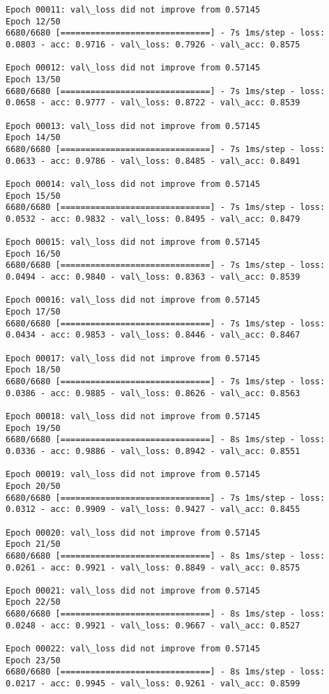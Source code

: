 \documentclass[11pt]{article}
\begin{document}
\begin{Verbatim}[commandchars=\\\{\}]
Epoch 00011: val\_loss did not improve from 0.57145
Epoch 12/50
6680/6680 [==============================] - 7s 1ms/step - loss: 0.0803 - acc: 0.9716 - val\_loss: 0.7926 - val\_acc: 0.8575

Epoch 00012: val\_loss did not improve from 0.57145
Epoch 13/50
6680/6680 [==============================] - 7s 1ms/step - loss: 0.0658 - acc: 0.9777 - val\_loss: 0.8722 - val\_acc: 0.8539

Epoch 00013: val\_loss did not improve from 0.57145
Epoch 14/50
6680/6680 [==============================] - 7s 1ms/step - loss: 0.0633 - acc: 0.9786 - val\_loss: 0.8485 - val\_acc: 0.8491

Epoch 00014: val\_loss did not improve from 0.57145
Epoch 15/50
6680/6680 [==============================] - 7s 1ms/step - loss: 0.0532 - acc: 0.9832 - val\_loss: 0.8495 - val\_acc: 0.8479

Epoch 00015: val\_loss did not improve from 0.57145
Epoch 16/50
6680/6680 [==============================] - 7s 1ms/step - loss: 0.0494 - acc: 0.9840 - val\_loss: 0.8363 - val\_acc: 0.8539

Epoch 00016: val\_loss did not improve from 0.57145
Epoch 17/50
6680/6680 [==============================] - 7s 1ms/step - loss: 0.0434 - acc: 0.9853 - val\_loss: 0.8446 - val\_acc: 0.8467

Epoch 00017: val\_loss did not improve from 0.57145
Epoch 18/50
6680/6680 [==============================] - 7s 1ms/step - loss: 0.0386 - acc: 0.9885 - val\_loss: 0.8626 - val\_acc: 0.8563

Epoch 00018: val\_loss did not improve from 0.57145
Epoch 19/50
6680/6680 [==============================] - 8s 1ms/step - loss: 0.0336 - acc: 0.9886 - val\_loss: 0.8942 - val\_acc: 0.8551

Epoch 00019: val\_loss did not improve from 0.57145
Epoch 20/50
6680/6680 [==============================] - 7s 1ms/step - loss: 0.0312 - acc: 0.9909 - val\_loss: 0.9427 - val\_acc: 0.8455

Epoch 00020: val\_loss did not improve from 0.57145
Epoch 21/50
6680/6680 [==============================] - 8s 1ms/step - loss: 0.0261 - acc: 0.9921 - val\_loss: 0.8849 - val\_acc: 0.8575

Epoch 00021: val\_loss did not improve from 0.57145
Epoch 22/50
6680/6680 [==============================] - 8s 1ms/step - loss: 0.0248 - acc: 0.9921 - val\_loss: 0.9667 - val\_acc: 0.8527

Epoch 00022: val\_loss did not improve from 0.57145
Epoch 23/50
6680/6680 [==============================] - 8s 1ms/step - loss: 0.0217 - acc: 0.9945 - val\_loss: 0.9261 - val\_acc: 0.8599


\end{Verbatim}
\end{document}
